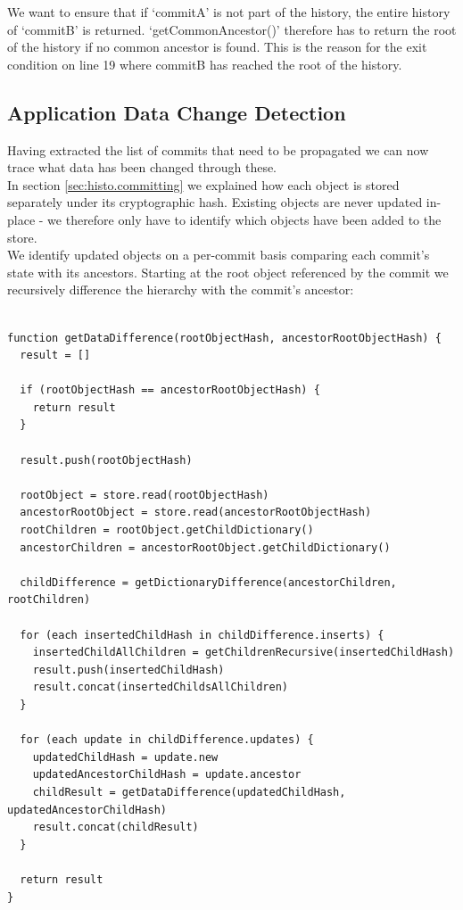 We want to ensure that if `commitA' is not part of the history, the entire history of `commitB' is returned.
`getCommonAncestor()' therefore has to return the root of the history if no common ancestor is found.
This is the reason for the exit condition on line 19 where commitB has reached the root of the history.

\subsection{Application Data Change Detection}

Having extracted the list of commits that need to be propagated we can now trace what data has been changed through these.\\
In section \ref{sec:histo.committing} we explained how each object is stored separately under its cryptographic hash.
Existing objects are never updated in-place - we therefore only have to identify which objects have been added to the store.\\

We identify updated objects on a per-commit basis comparing each commit's state with its ancestors.
Starting at the root object referenced by the commit we recursively difference the hierarchy with the commit's ancestor:

\begin{lstlisting}[caption=Detecting data difference across commits, label=data-difference]

function getDataDifference(rootObjectHash, ancestorRootObjectHash) {
  result = []

  if (rootObjectHash == ancestorRootObjectHash) {
    return result
  }

  result.push(rootObjectHash)

  rootObject = store.read(rootObjectHash)
  ancestorRootObject = store.read(ancestorRootObjectHash)
  rootChildren = rootObject.getChildDictionary()
  ancestorChildren = ancestorRootObject.getChildDictionary()

  childDifference = getDictionaryDifference(ancestorChildren, rootChildren)

  for (each insertedChildHash in childDifference.inserts) {
    insertedChildAllChildren = getChildrenRecursive(insertedChildHash)
    result.push(insertedChildHash)
    result.concat(insertedChildsAllChildren)
  }

  for (each update in childDifference.updates) {
    updatedChildHash = update.new
    updatedAncestorChildHash = update.ancestor
    childResult = getDataDifference(updatedChildHash, updatedAncestorChildHash)
    result.concat(childResult)
  }

  return result
}

\end{lstlisting}

